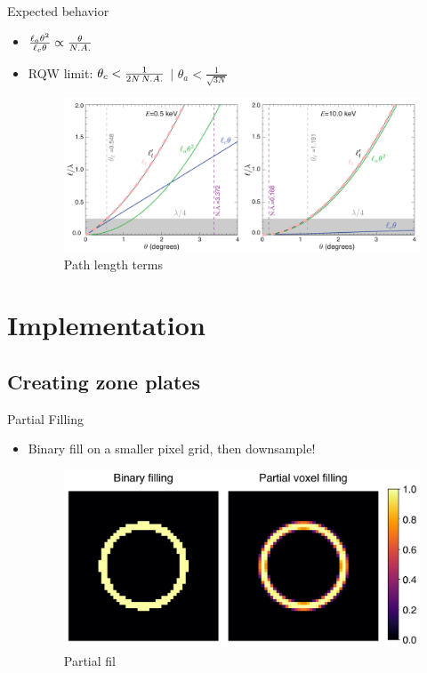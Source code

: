 \documentclass{beamer}
\def\thetaellc{\theta_c} %
\def\thetaella{\theta_a} %
\def\ellapproxc{\ell_{c}}
\def\ellapproxa{\ell_{a}}
\def\thetaellc{\theta_c} %
\def\thetaella{\theta_a} %
\def\ellapproxc{\ell_{c}}
\def\ellapproxa{\ell_{a}}
\begin{document}
\begin{frame}{Expected behavior}
	\begin{itemize}
		\item $\frac{\ellapproxa \theta^{2}}{\ellapproxc\theta} \propto\frac{\theta}{\scriptsize{N.A.}}$
		\item RQW limit\footnotemark : $\thetaellc < \frac{1}{2N\,\scriptsize{N.A.}}$ $|$ $\thetaella < \frac{1}{\sqrt{3N}}$
		\begin{center}
			\begin{figure}
				\includegraphics[scale=0.35]{path_length_terms}
				\caption{Path length terms}	
			\end{figure}
		\end{center}
	\end{itemize}
\end{frame}


\section{Implementation}
\subsection{Creating zone plates}
\begin{frame}{Partial Filling}
	\begin{itemize}
		\item Binary fill on a smaller pixel grid, then downsample!
		\begin{center}
			\begin{figure}
				\includegraphics[scale=0.35]{partial_fill}
				\caption{Partial fil}	
			\end{figure}
		\end{center}
	\end{itemize}
\end{frame}
\end{document}
